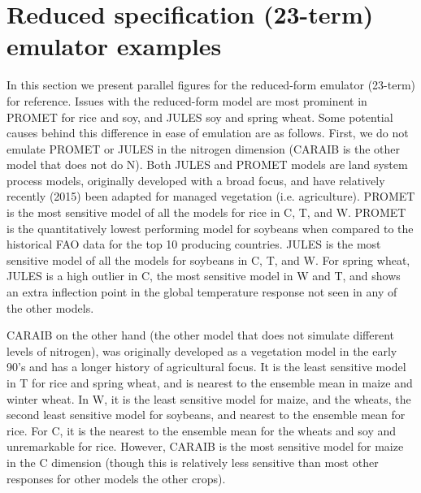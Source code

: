 \documentclass[12pt]{article}
\begin{document}
\section{Reduced specification (23-term) emulator examples}
\smallskip
\begin{flushleft}
In this section we present parallel figures for the reduced-form emulator (23-term) for reference. 
Issues with the reduced-form model are most prominent in PROMET for rice and soy, and JULES soy and spring wheat. 
Some potential causes behind this difference in ease of emulation are as follows.
First, we do not emulate PROMET or JULES in the nitrogen dimension (CARAIB is the other model that does not do N). 
Both JULES and PROMET models are land system process models, originally developed with a broad focus, and have relatively recently (2015) been adapted for managed vegetation (i.e. agriculture).
PROMET is the most sensitive model of all the models for rice in C, T, and W. 
PROMET is the quantitatively lowest performing model for soybeans when compared to the historical FAO data for the top 10 producing countries. 
JULES is the most sensitive model of all the models for soybeans in C, T, and W. 
For spring wheat, JULES is a high outlier in C, the most sensitive model in W and T, and shows an extra inflection point in the global temperature response not seen in any of the other models.
\end{flushleft}
\smallskip
\begin{flushleft}
CARAIB on the other hand (the other model that does not simulate different levels of nitrogen), was originally developed as a vegetation model in the early 90's and has a longer history of agricultural focus. It is the least sensitive model in T for rice and spring wheat, and is nearest to the ensemble mean in maize and winter wheat. 
In W, it is the least sensitive model for maize, and the wheats, the second least sensitive model for soybeans, and nearest to the ensemble mean for rice. 
For C, it is the nearest to the ensemble mean for the wheats and soy and unremarkable for rice. 
However, CARAIB is the most sensitive model for maize in the C dimension (though this is relatively less sensitive than most other responses for other models the other crops).
\end{flushleft}
\end{document}
